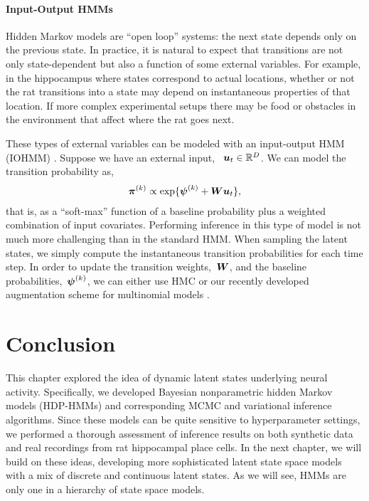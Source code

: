 \paragraph{Input-Output HMMs}
Hidden Markov models are ``open loop'' systems: the next state 
depends only on the previous state.  In practice, it is natural to 
expect that transitions are not only state-dependent but also a 
function of some external variables. For example, in the hippocampus 
where states correspond to actual locations, whether or not the 
rat transitions into a state may depend on instantaneous properties 
of that location. If more complex experimental setups there may 
be food or obstacles in the environment that affect where the rat 
goes next. 

These types of external variables can be modeled with an input-output 
HMM (IOHMM) \citep{bengio1995input}. Suppose we have an external input,
~$\boldsymbol{u}_t \in \mathbb{R}^D$. We can model the transition probability as,
\begin{align*}
\boldsymbol{\pi}^{(k)} &\propto \exp\{\boldsymbol{\psi}^{(k)} + \boldsymbol{W} \boldsymbol{u}_t\}, \\
\end{align*}
that is, as a ``soft-max'' function of a baseline probability plus a 
weighted combination of input covariates.  Performing inference in this 
type of model is not much more challenging than in the standard HMM.
When sampling the latent states, we simply compute the instantaneous
transition probabilities for each time step. In order to update the 
transition weights,~$\boldsymbol{W}$, and the baseline probabilities,~$\boldsymbol{\psi}^{(k)}$,
we can either use HMC or our recently developed \polyagamma augmentation scheme for multinomial
models \citep{linderman2015dependent}.


\section{Conclusion}
This chapter explored the idea of dynamic latent states underlying
neural activity. Specifically, we developed Bayesian nonparametric
hidden Markov models (HDP-HMMs) and corresponding MCMC and variational
inference algorithms. Since these models can be quite sensitive to
hyperparameter settings, we performed a thorough assessment of
inference results on both synthetic data and real recordings from rat
hippocampal place cells.  In the next chapter, we will build on these
ideas, developing more sophisticated latent state space models with a
mix of discrete and continuous latent states. As we will see, HMMs are
only one in a hierarchy of state space models.

